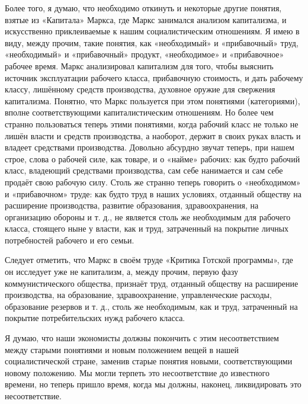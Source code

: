 \documentclass[12pt, a4paper, openany]{book}
\begin{document}
Более того, я думаю, что необходимо откинуть и некоторые другие понятия, взятые из «Капитала» Маркса, где Маркс занимался анализом капитализма, и искусственно приклеиваемые к нашим социалистическим отношениям. Я имею в виду, между прочим, такие понятия, как «необходимый» и «прибавочный» труд, «необходимый» и «прибавочный» продукт, «необходимое» и «прибавочное» рабочее время. Маркс анализировал капитализм для того, чтобы выяснить источник эксплуатации рабочего класса, прибавочную стоимость, и дать рабочему классу, лишённому средств производства, духовное оружие для свержения капитализма. Понятно, что Маркс пользуется при этом понятиями (категориями), вполне соответствующими капиталистическим отношениям. Но более чем странно пользоваться теперь этими понятиями, когда рабочий класс не только не лишён власти и средств производства, а наоборот, держит в своих руках власть и владеет средствами производства. Довольно абсурдно звучат теперь, при нашем строе, слова о рабочей силе, как товаре, и о «найме» рабочих: как будто рабочий класс, владеющий средствами производства, сам себе нанимается и сам себе продаёт свою рабочую силу. Столь же странно теперь говорить о «необходимом» и «прибавочном» труде: как будто труд в наших условиях, отданный обществу на расширение производства, развитие образования, здравоохранения, на организацию обороны и т. д., не является столь же необходимым для рабочего класса, стоящего ныне у власти, как и труд, затраченный на покрытие личных потребностей рабочего и его семьи.

Следует отметить, что Маркс в своём труде «Критика Готской программы», где он исследует уже не капитализм, а, между прочим, первую фазу коммунистического общества, признаёт труд, отданный обществу на расширение производства, на образование, здравоохранение, управленческие расходы, образование резервов и т. д., столь же необходимым, как и труд, затраченный на покрытие потребительских нужд рабочего класса.

Я думаю, что наши экономисты должны покончить с этим несоответствием между старыми понятиями и новым положением вещей в нашей социалистической стране, заменив старые понятия новыми, соответствующими новому положению. Мы могли терпеть это несоответствие до известного времени, но теперь пришло время, когда мы должны, наконец, ликвидировать это несоответствие.

\vspace{0.4cm}

\subsection[3. Вопрос о законе стоимости при социализме]{}
\end{document}
